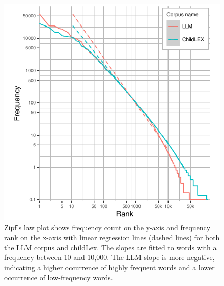 \documentclass[manuscript]{stjour}
\begin{document}
\begin{figure}[!ht]
  \centering
    \includegraphics[width=.7\textwidth]{figures/rankplot-normal-3.5-2.pdf}
    \caption{Zipf's law plot shows frequency count on the y-axis and frequency rank on the x-axis with linear regression lines (dashed lines) for both the LLM corpus and childLex. The slopes are fitted to words with a frequency between 10 and 10,000. The LLM slope is more negative, indicating a higher occurrence of highly frequent words and a lower occurrence of low-frequency words.}
    \label{fig:rankplot-normal}
\end{figure}
\end{document}
